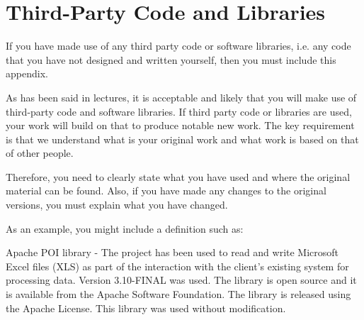 \chapter{Third-Party Code and Libraries}

If you have made use of any third party code or software libraries, i.e. any code that you have not designed and written yourself, then you must include this appendix. 

As has been said in lectures, it is acceptable and likely that you will make use of third-party code and software libraries. If third party code or libraries are used, your work will build on that to produce notable new work. The key requirement is that we understand what is your original work and what work is based on that of other people. 

Therefore, you need to clearly state what you have used and where the original material can be found. Also, if you have made any changes to the original versions, you must explain what you have changed. 

As an example, you might include a definition such as: 

Apache POI library - The project has been used to read and write Microsoft Excel files (XLS) as part of the interaction with the client's existing system for processing data. Version 3.10-FINAL was used. The library is open source and it is available from the Apache Software Foundation. The library is released using the Apache License. This library was used without modification. 
